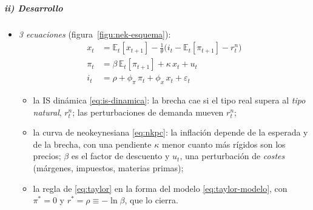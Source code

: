 \documentclass[11pt]{article}
\begin{document}
\subparagraph{ii) Desarrollo}

\begin{itemize}
\item \emph{3 ecuaciones} (figura~\ref{figu:nek-esquema}):
  \begin{align}
  x_t&=\mathbb{E}_t[x_{t+1}]-\frac{1}{\theta}\big(i_t-\mathbb{E}_t[\pi_{t+1}]-r^n_t\big) \label{eq:is-dinamica}\\
  \pi_t&=\beta\,\mathbb{E}_t[\pi_{t+1}]+\kappa\,x_t+u_t \label{eq:nkpc}\\
  i_t&=\rho+\phi_\pi\,\pi_t+\phi_x\,x_t+\varepsilon_t \label{eq:taylor-modelo}
  \end{align}
  \begin{itemize}
  \item la IS dinámica \eqref{eq:is-dinamica}: la brecha cae si el tipo real supera al \emph{tipo natural}, $r^n_t$; las perturbaciones de demanda mueven $r^n_t$;
  \item la curva de  neokeynesiana \eqref{eq:nkpc}: la inflación depende de la esperada y de la brecha, con una pendiente $\kappa$ menor cuanto más rígidos son los precios; $\beta$ es el factor de descuento y $u_t$, una perturbación de \emph{costes} (márgenes, impuestos, materias primas);
  \item la regla de  \eqref{eq:taylor} en la forma del modelo \eqref{eq:taylor-modelo}, con $\pi^*=0$ y $r^*=\rho\equiv-\ln\beta$, que lo cierra.
  \end{itemize}
\end{itemize}

\begin{infografia}[H]
\centering
\caption{El modelo canónico: 3~ecuaciones que se cierran entre sí}\label{figu:nek-esquema}
\end{infografia}
\end{document}
